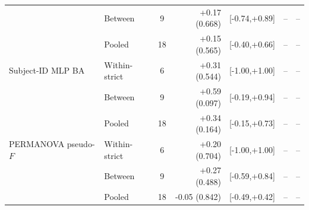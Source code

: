 \begin{table}[t]
\begin{tabular}{llcrrrr}
 & Between & 9 & +0.17 (0.668) & [-0.74,+0.89] & -- & -- \\
 & Pooled & 18 & +0.15 (0.565) & [-0.40,+0.66] & -- & -- \\
\addlinespace
Subject-ID MLP BA & Within-strict & 6 & +0.31 (0.544) & [-1.00,+1.00] & -- & -- \\
 & Between & 9 & +0.59 (0.097) & [-0.19,+0.94] & -- & -- \\
 & Pooled & 18 & +0.34 (0.164) & [-0.15,+0.73] & -- & -- \\
\addlinespace
PERMANOVA pseudo-$F$ & Within-strict & 6 & +0.20 (0.704) & [-1.00,+1.00] & -- & -- \\
 & Between & 9 & +0.27 (0.488) & [-0.59,+0.84] & -- & -- \\
 & Pooled & 18 & -0.05 (0.842) & [-0.49,+0.42] & -- & -- \\
\bottomrule
\end{tabular}
\end{table}
